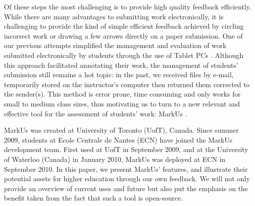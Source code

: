 \documentclass[twocolumn,10pt]{asme2e}
\begin{document}
Of these steps the most challenging is to provide high quality feedback efficiently. While there are many advantages to submitting work electronically, it is challenging to provide the kind of simple efficient feedback achieved by circling incorrect work or drawing a few arrows directly on a paper submission. One of our previous attempts simplified the management and evaluation of work submitted electronically by students through the use of Tablet PCs \cite{magnin-tice-2010}. Although this approach facilitated annotating their work, the management of students' submission still remains a hot topic: in the past, we received files by e-mail, temporarily stored on the instructor's computer then returned them corrected to the sender(s). This method is error prone, time consuming and only works for small to medium class sizes, thus motivating us to turn to a new relevant and effective tool for the assessment of students' work: MarkUs \cite{markus}.

MarkUs was created at University of Toronto (UofT), Canada. Since summer 2009, students at Ecole Centrale de Nantes (ECN) have joined the MarkUs development team. First used at UofT in September 2009, and at the University of Waterloo (Canada) in January 2010, MarkUs was deployed at ECN in September 2010. In this paper, we present MarkUs' features, and illustrate their potential assets for higher education through our own feedback. We will not only provide an overview of current uses and future but also put the emphasis on the benefit taken from the fact that such a tool is open-source. 
\end{document}
